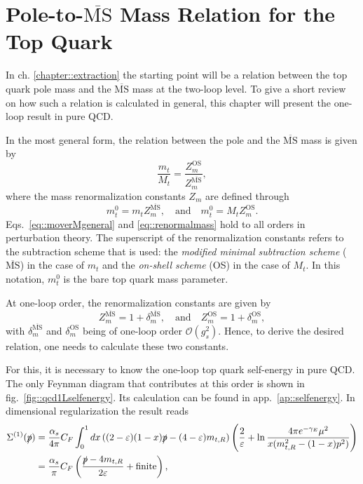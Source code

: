 \documentclass[a4paper,12pt]{book}
\begin{document}
\section{Pole-to-$\overline{\text{MS}}$ Mass Relation for the Top Quark} 
In ch. \ref{chapter::extraction} the starting point will be a relation between the top quark pole mass and the $\overline{\text{MS}}$ mass at the two-loop level. To give a short review on how such a relation is calculated in general, this chapter will present the one-loop result in pure QCD.\par
In the most general form, the relation between the pole and the $\overline{\text{MS}}$ mass is given by
\begin{equation}
\label{eq::moverMgeneral}
\frac{m_t}{M_t} = \frac{Z_m^\text{OS}}{Z_m^{\overline{\text{MS}}}},
\end{equation}
where the mass renormalization constants $Z_m$ are defined through
\begin{equation}
\label{eq::renormalmass}
m_t^0 = m_t Z_m^{\overline{\text{MS}}}, \quad \text{and} \quad
m_t^0 = M_t Z_m^\text{OS} .
\end{equation}
Eqs.\ \eqref{eq::moverMgeneral} and \eqref{eq::renormalmass} hold to all orders in perturbation theory. The superscript of the renormalization constants refers to the subtraction scheme that is used: the \textit{modified minimal subtraction scheme} ($\overline{\text{MS}}$) in the case of $m_t$ and the \textit{on-shell scheme} (OS) in the case of $M_t$. In this notation, $m_t^0$ is the bare top quark mass parameter.\par
At one-loop order, the renormalization constants are given by 
\begin{equation}
Z_m^{\overline{\text{MS}}}=1+\delta_m^{\overline{\text{MS}}}, \quad \text{and} \quad
Z_m^\text{OS} = 1+\delta_m^\text{OS},
\end{equation}
with $\delta_m^{\overline{\text{MS}}}$ and $\delta_m^\text{OS}$ being of one-loop order $\mathcal{O}(g_s^2)$. Hence, to derive the desired relation, one needs to calculate these two constants.\par
For this, it is necessary to know the one-loop top quark self-energy in pure QCD. The only Feynman diagram that contributes at this order is shown in fig.\ \ref{fig::qcd1Lselfenergy}. Its calculation can be found in app.\ \ref{ap::selfenergy}. In dimensional regularization the result reads
\begin{align}
\label{eq::selfenergyQCD}
\Sigma^{(1)}(\slashed{p}) &= \frac{\alpha_s}{4\pi} C_F \int^1_0 dx\, ((2-\varepsilon)(1-x)\slashed{p}-(4-\varepsilon) m_{t,R}) \left(\frac{2}{\varepsilon}+\ln \frac{4\pi e^{-\gamma_E}\mu^2}{x(m_{t,R}^2-(1-x)p^2)}\right)\\
&= \frac{\alpha_s}{\pi}C_F \left(\frac{\slashed{p}-4m_{t,R}}{2\varepsilon}+\text{finite}\right),
\end{align}
\end{document}
